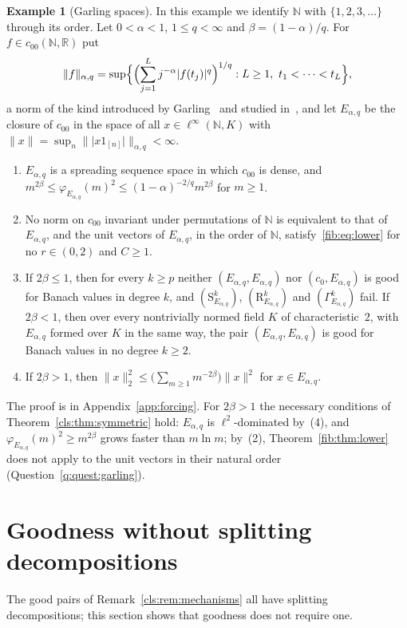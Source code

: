 \documentclass[11pt]{amsart}
\theoremstyle{definition}
\theoremstyle{remark}
\numberwithin{equation}{section}
\newcommand{\N}{\mathbb N}
\newcommand{\linf}{\ell^\infty}
\newcommand{\abs}[1]{\lvert #1\rvert}
\newcommand{\norm}[1]{\lVert #1\rVert}
\theoremstyle{plain}
\theoremstyle{definition}
\newtheorem{example}[theorem]{Example}
\theoremstyle{plain}
\begin{document}
\begin{example}[Garling spaces]\label{cls:ex:garling}
In this example we identify $\N$ with $\{1,2,3,\dots\}$ through its order. Let $0<\alpha<1$, $1\le q<\infty$ and
$\beta=(1-\alpha)/q$. For $f\in c_{00}(\N,\mathbb R)$ put
\[
 \norm f_{\alpha,q}=\sup\Bigl\{\Bigl(\sum_{j=1}^Lj^{-\alpha}\abs{f(t_j)}^q\Bigr)^{1/q}:L\ge1,\ t_1<\dots<t_L\Bigr\},
\]
a norm of the kind introduced by Garling~\cite{Ga} and studied in~\cite{AAW}, and let $E_{\alpha,q}$ be the closure of $c_{00}$ in the space
of all $x\in\linf(\N,K)$ with $\norm x=\sup_n\norm{\abs{x1_{[n]}}}_{\alpha,q}<\infty$.
\begin{enumerate}
\item $E_{\alpha,q}$ is a spreading sequence space in which $c_{00}$ is dense, and
$m^{2\beta}\le\varphi_{E_{\alpha,q}}(m)^2\le(1-\alpha)^{-2/q}m^{2\beta}$ for $m\ge1$.
\item No norm on $c_{00}$ invariant under permutations of $\N$ is equivalent to that of $E_{\alpha,q}$, and the unit
vectors of $E_{\alpha,q}$, in the order of $\N$, satisfy~\eqref{fib:eq:lower} for no $r\in(0,2)$ and $C\ge1$.
\item If $2\beta\le1$, then for every $k\ge p$ neither $(E_{\alpha,q},E_{\alpha,q})$ nor $(c_0,E_{\alpha,q})$ is good for
Banach values in degree $k$, and $(\mathrm S^k_{E_{\alpha,q}})$, $(\mathrm R^k_{E_{\alpha,q}})$ and
$(\Gamma^k_{E_{\alpha,q}})$ fail. If $2\beta<1$, then over every nontrivially normed field $K$ of characteristic~$2$,
with $E_{\alpha,q}$ formed over $K$ in the same way, the pair $(E_{\alpha,q},E_{\alpha,q})$ is good for Banach values in no
degree $k\ge2$.
\item If $2\beta>1$, then $\norm x_2^2\le\bigl(\sum_{m\ge1}m^{-2\beta}\bigr)\norm x^2$ for $x\in E_{\alpha,q}$.
\end{enumerate}
\end{example}

The proof is in Appendix~\ref{app:forcing}. For $2\beta>1$ the necessary conditions of Theorem~\ref{cls:thm:symmetric}
hold: $E_{\alpha,q}$ is $\ell^2$\nobreakdash-dominated by~(4), and $\varphi_{E_{\alpha,q}}(m)^2\ge m^{2\beta}$ grows faster than
$m\ln m$; by~(2), Theorem~\ref{fib:thm:lower} does not apply to the unit vectors in their natural order
(Question~\ref{q:quest:garling}).
\section{Goodness without splitting decompositions}\label{sec:beyond}
The good pairs of Remark~\ref{cls:rem:mechanisms} all have splitting decompositions; this section shows that goodness
does not require one.
\end{document}
